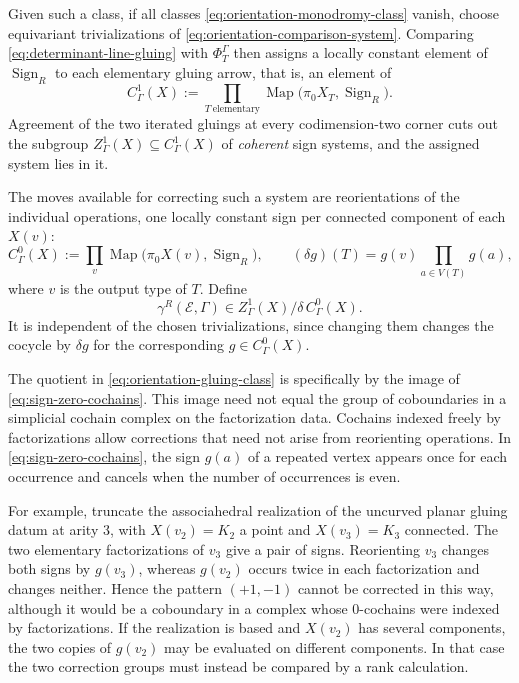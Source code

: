 \documentclass[11pt,letterpaper,twoside]{article}
\theoremstyle{plain}
\theoremstyle{definition}
\theoremstyle{remark}
\begin{document}
Given such a class, if all classes \eqref{eq:orientation-monodromy-class} vanish, choose equivariant trivializations of \eqref{eq:orientation-comparison-system}.  Comparing \eqref{eq:determinant-line-gluing} with $\Phi_T^\Gamma$ then assigns a locally constant element of $\operatorname{Sign}_R$ to each elementary gluing arrow, that is, an element of
\begin{equation}\label{eq:sign-one-cochains}
 C^1_\Gamma(X)
 :=\prod_{T\ \mathrm{elementary}}
 \operatorname{Map}\bigl(\pi_0X_T,\operatorname{Sign}_R\bigr).
\end{equation}
Agreement of the two iterated gluings at every codimension-two corner cuts out the subgroup $Z^1_\Gamma(X)\subseteq C^1_\Gamma(X)$ of \emph{coherent} sign systems, and the assigned system lies in it.

The moves available for correcting such a system are reorientations of the individual operations, one locally constant sign per connected component of each $X(v)$:
\begin{equation}\label{eq:sign-zero-cochains}
 C^0_\Gamma(X)
 :=\prod_{v}
 \operatorname{Map}\bigl(\pi_0X(v),\operatorname{Sign}_R\bigr),
 \qquad
 (\delta g)(T)=g(v)\prod_{a\in V(T)}g(a),
\end{equation}
where $v$ is the output type of $T$.  Define
\begin{equation}\label{eq:orientation-gluing-class}
 \gamma^R(\mathcal E,\Gamma)
 \in
 Z^1_\Gamma(X)\big/\delta\,C^0_\Gamma(X).
\end{equation}
It is independent of the chosen trivializations, since changing them changes the cocycle by $\delta g$ for the corresponding $g\in C^0_\Gamma(X)$.

The quotient in \eqref{eq:orientation-gluing-class} is specifically by the image of \eqref{eq:sign-zero-cochains}.  This image need not equal the group of coboundaries in a simplicial cochain complex on the factorization data.  Cochains indexed freely by factorizations allow corrections that need not arise from reorienting operations.  In \eqref{eq:sign-zero-cochains}, the sign $g(a)$ of a repeated vertex appears once for each occurrence and cancels when the number of occurrences is even.

For example, truncate the associahedral realization of the uncurved planar gluing datum at arity \(3\), with \(X(v_2)=K_2\) a point and \(X(v_3)=K_3\) connected.  The two elementary factorizations of \(v_3\) give a pair of signs.  Reorienting \(v_3\) changes both signs by \(g(v_3)\), whereas \(g(v_2)\) occurs twice in each factorization and changes neither.  Hence the pattern \((+1,-1)\) cannot be corrected in this way, although it would be a coboundary in a complex whose \(0\)-cochains were indexed by factorizations.  If the realization is based and \(X(v_2)\) has several components, the two copies of \(g(v_2)\) may be evaluated on different components.  In that case the two correction groups must instead be compared by a rank calculation.
\end{document}
